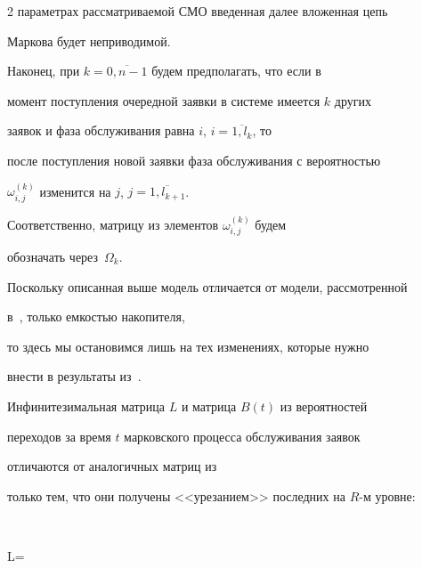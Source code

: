 \begin{multicols}{2}
параметрах рассматриваемой СМО введенная далее вложенная цепь


Маркова будет неприводимой.





Наконец, при $k=\overline{0,n-1}$ будем предполагать, что если в


момент поступления очередной заявки в системе имеется $k$ других


заявок и фаза обслуживания равна $i$, $i=\overline{1,l_k}$, то


после поступления новой заявки фаза обслуживания с вероятностью


$\omega^{(k)}_{i,j}$ изменится на $j$, $j=\overline{1,l_{k+1}}$.


Соответственно, матрицу из элементов $\omega^{(k)}_{i,j}$ будем


обозначать через~$\Omega_k$.





Поскольку описанная выше модель отличается от модели, рассмотренной


в~\cite{PSCh06}, только емкостью накопителя,


то здесь мы остановимся лишь на тех изменениях, которые нужно


внести в результаты из~\cite{PSCh06}.





Инфинитезимальная матрица $L$ и матрица $B(t)$ из вероятностей


переходов за время $t$ марковского процесса обслуживания заявок


отличаются от аналогичных матриц из~\cite{PSCh06}


только тем, что они получены <<урезанием>> последних на $R$-м уровне:


\end{multicols}


\noindent


$$


L=


